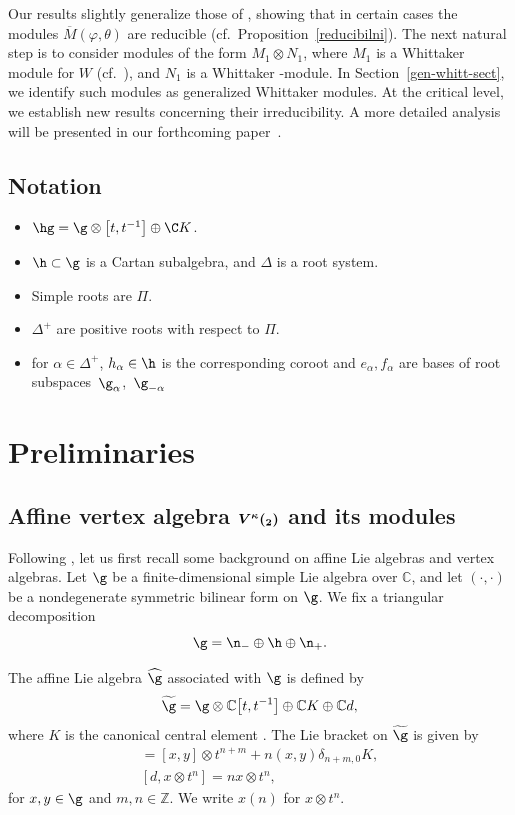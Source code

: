 \documentclass[pdftex]{sigma}
\numberwithin{equation}{section}
\theoremstyle{definition}
\newcommand{\1}{\textbf{1}}
\begin{document}
Our results slightly generalize those of \cite{FGXZ}, showing that in certain cases the modules $\overline{M}(\varphi, \theta)$ are reducible
(cf.~Proposition~\ref{reducibilni}).
The next natural step is to consider modules of the form $M_1 \otimes N_1$, where $M_1$ is a Whittaker module for $W$ (cf.~\cite{ALPY}), and $N_1$ is a Whittaker -module. In Section~\ref{gen-whitt-sect}, we identify such modules as generalized Whittaker modules. At the critical level, we establish new results concerning their irreducibility. A more detailed analysis will be presented in our forthcoming paper~\cite{AP-2026}.

\subsection*{Notation}
\begin{itemize}\itemsep=0pt
 \item $\hg = \g\otimes \bigl[t, t^{-1}\bigr]\oplus \C K$.
 \item $\h\subset \g$ is a Cartan subalgebra, and $\Delta$ is a root system.
 \item Simple roots are $\Pi$.
 \item $\Delta^+$ are positive roots with respect to $\Pi$.
 \item for $\alpha \in \Delta^+$, $h_{\alpha}\in \h$ is the corresponding coroot and $e_{\alpha}, f_{\alpha}$ are bases of root subspaces~$\g_{\alpha}$,~$\g_{-\alpha}$
\end{itemize}

\section{Preliminaries}\label{preliminaries}

\subsection[Affine vertex algebra V\^{}kappa(sl\_2) and its modules]{Affine vertex algebra $\boldsymbol{V^{\kappa}(\sl_2)}$ and its modules}

Following \cite{FB,K2,LL}, let us first recall some background on affine Lie algebras and vertex algebras.
Let ${\g}$ be a finite-dimensional simple Lie algebra over $\mathbb{C}$, and let $(\cdot,\cdot)$ be a nondegenerate symmetric bilinear form on ${\g}$.
We fix a triangular decomposition
\[
 {\g} = {\n}_{-} \oplus {\h} \oplus {\n}_{+}.
\]

The affine Lie algebra $\widehat{\g}$ associated with ${\g}$ is defined by
\[
 \widetilde{\g} = {\g} \otimes \mathbb{C}\bigl[t,t^{-1}\bigr] \oplus \mathbb{C}K \oplus \mathbb{C}d,
\]
where $K$ is the canonical central element \cite{K}.
The Lie bracket on $\widetilde{\g}$ is given by
\begin{gather*}
 [x \otimes t^n, y \otimes t^m] = [x,y] \otimes t^{n+m} + n (x,y) \delta_{n+m,0} K, \\ %
 [d, x \otimes t^n] = n x \otimes t^n,  %
\end{gather*}
for $x,y \in {\g}$ and $m,n \in \mathbb{Z}$.
We write $x(n)$ for $x \otimes t^n$.
\end{document}
